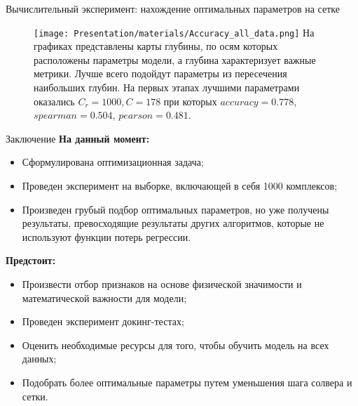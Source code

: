 \documentclass[hyperref={unicode}]{beamer}
\begin{document}
\begin{frame}{Вычислительный эксперимент: нахождение оптимальных параметров на сетке}
\begin{figure}[h]
\begin{minipage}[h]{0.49\linewidth}
\end{minipage}
\hfill
\begin{minipage}[h]{0.49\linewidth}
\texttt{[image: Presentation/materials/Accuracy\_all\_data.png]}
\scriptsize На графиках представлены карты глубины, по осям которых расположены параметры модели, а глубина характеризует важные метрики. Лучше всего подойдут параметры из пересечения наибольших глубин.
На первых этапах лучшими параметрами оказались $C_r = 1000, C = 178$ при которых $accuracy = 0.778$, $spearman = 0.504$, $pearson = 0.481$.
$\;\;\;\;\;\;\;\;\;\;\;\;\;\;\;\;\;\;\;\;\;\;\;\;\;\;\;\;\;\;\;\;\;\;\;\;\;\;\;\;\;\;\;\;\;\;\;\;\;\;\;\;\;\;\;\;\;\;\;\;\;\;\;\;\;\;\;\;\;\;\;\;\;\;\;\;\;\;\;\;\;\;\;\;\;\;\;\;\;\;\;\;\;\;$
\end{minipage}
\end{figure}
\end{frame}

\begin{frame}{Заключение}
\textbf{На данный момент:}\\
\begin{itemize}
    \item Сформулирована оптимизационная задача;
    \item Проведен эксперимент на выборке, включающей в себя 1000 комплексов;
    \item Произведен грубый подбор оптимальных параметров, но уже получены результаты, превосходящие результаты других алгоритмов, которые не используют функции потерь регрессии.
\end{itemize}
\textbf{Предстоит:}\\
\begin{itemize}
    \item Произвести отбор признаков на основе физической значимости и математической важности для модели;
    \item Проведен эксперимент докинг-тестах;
    \item Оценить необходимые ресурсы для того, чтобы обучить модель на всех данных;
    \item Подобрать более оптимальные параметры путем уменьшения шага солвера и сетки.
\end{itemize}
\end{frame}
\end{document}
